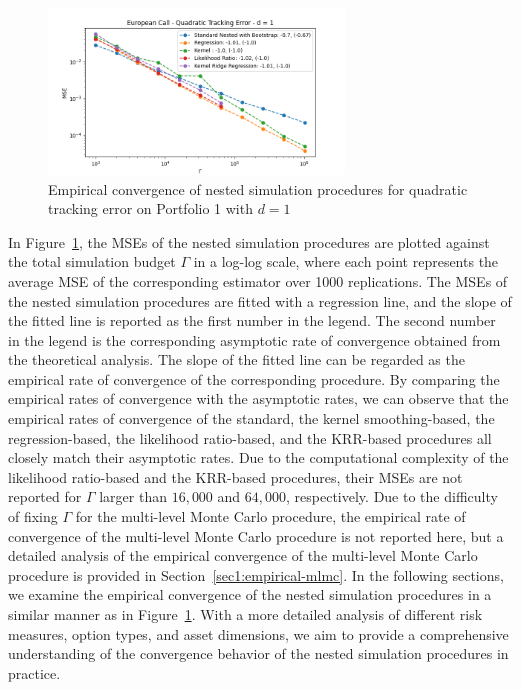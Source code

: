 \begin{figure}[ht!]
    \centering
    \includegraphics[width=0.7\textwidth]{./project1/figures/figure1.png}
    \caption{Empirical convergence of nested simulation procedures for quadratic tracking error on Portfolio 1 with $d=1$}
    \label{fig1:compareAll} 
\end{figure}
In Figure~\ref{fig1:compareAll}, the MSEs of the nested simulation procedures are plotted against the total simulation budget $\Gamma$ in a log-log scale, where each point represents the average MSE of the corresponding estimator over 1000 replications.
The MSEs of the nested simulation procedures are fitted with a regression line, and the slope of the fitted line is reported as the first number in the legend.
The second number in the legend is the corresponding asymptotic rate of convergence obtained from the theoretical analysis.
The slope of the fitted line can be regarded as the empirical rate of convergence of the corresponding procedure.
By comparing the empirical rates of convergence with the asymptotic rates, we can observe that the empirical rates of convergence of the standard, the kernel smoothing-based, the regression-based, the likelihood ratio-based, and the KRR-based procedures all closely match their asymptotic rates.
Due to the computational complexity of the likelihood ratio-based and the KRR-based procedures, their MSEs are not reported for $\Gamma$ larger than $16,000$ and $64,000$, respectively.
Due to the difficulty of fixing $\Gamma$ for the multi-level Monte Carlo procedure, the empirical rate of convergence of the multi-level Monte Carlo procedure is not reported here, but a detailed analysis of the empirical convergence of the multi-level Monte Carlo procedure is provided in Section~\ref{sec1:empirical-mlmc}.
In the following sections, we examine the empirical convergence of the nested simulation procedures in a similar manner as in Figure~\ref{fig1:compareAll}.
With a more detailed analysis of different risk measures, option types, and asset dimensions, we aim to provide a comprehensive understanding of the convergence behavior of the nested simulation procedures in practice.

